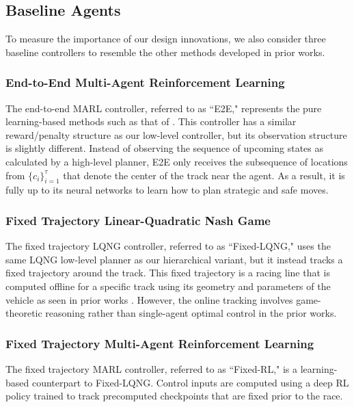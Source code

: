 \subsection{Baseline Agents}
To measure the importance of our design innovations, we also consider three baseline controllers to resemble the other methods developed in prior works.  
\subsubsection{End-to-End Multi-Agent Reinforcement Learning}
The end-to-end MARL controller, referred to as ``E2E," represents the pure learning-based methods such as that of \cite{sonyai}. This controller has a similar reward/penalty structure as our low-level controller, but its observation structure is slightly different. Instead of observing the sequence of upcoming states as calculated by a high-level planner, E2E only receives the subsequence of locations from $\{c_i\}_{i=1}^{\tau}$ that denote the center of the track near the agent. As a result, it is fully up to its neural networks to learn how to plan strategic and safe moves. 

\subsubsection{Fixed Trajectory Linear-Quadratic Nash Game}
The fixed trajectory LQNG controller, referred to as ``Fixed-LQNG," uses the same LQNG low-level planner as our hierarchical variant, but it instead tracks a fixed trajectory around the track. This fixed trajectory is a racing line that is computed offline for a specific track using its geometry and parameters of the vehicle as seen in prior works \cite{vazquez2020optimizationbased, graphtraj}. However, the online tracking involves game-theoretic reasoning rather than single-agent optimal control in the prior works.

\subsubsection{Fixed Trajectory Multi-Agent Reinforcement Learning}
The fixed trajectory MARL controller, referred to as ``Fixed-RL," is a learning-based counterpart to Fixed-LQNG. Control inputs are computed using a deep RL policy trained to track precomputed checkpoints that are fixed prior to the race.  
